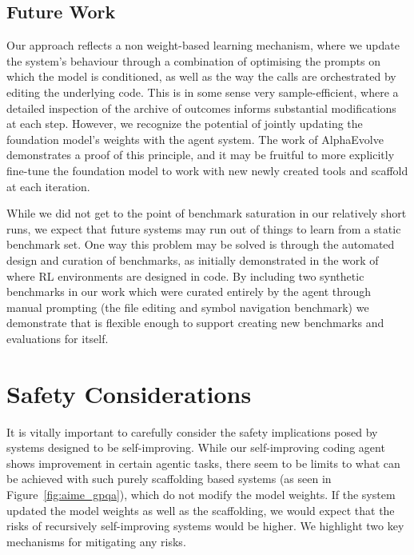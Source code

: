 \subsection{Future Work}
\label{sec:future}

Our approach reflects a non weight-based learning mechanism, where we update the
system's behaviour through a combination of optimising the prompts on which the
model is conditioned, as well as the way the  calls are orchestrated by
editing the underlying code. This is in some sense very sample-efficient, where
a detailed inspection of the archive of outcomes informs substantial
modifications at each step. However, we recognize the potential of jointly
updating the foundation model's weights with the agent system. The work of
AlphaEvolve \citep{novikovAlphaEvolveCodingAgent2025} demonstrates a proof of
this principle, and it may be fruitful to more explicitly fine-tune the foundation
model to work with new newly created tools and scaffold at each iteration.

While we did not get to the point of benchmark saturation in our relatively
short runs, we expect that future systems may run out of things to learn from a
static benchmark set. One way this problem may be solved is through the
automated design and curation of benchmarks, as initially demonstrated in the
work of \cite{faldorOMNIEPICOpenendednessModels2024} where RL environments are
designed in code. By including two synthetic benchmarks in our work which were
curated entirely by the agent through manual prompting (the file editing and
symbol navigation benchmark) we demonstrate that  is flexible enough
to support creating new benchmarks and evaluations for itself.

\section{Safety Considerations}%
\label{subsec:safety}

It is vitally important to carefully consider the safety implications posed by systems designed to be self-improving.
While our self-improving coding agent shows improvement in certain agentic tasks, there seem to be limits to what
can be achieved with such purely scaffolding based systems (as seen in Figure~\ref{fig:aime_gpqa}), which do not modify the model weights.
If the system updated the model weights as well as the scaffolding, we would expect that the risks of recursively self-improving systems would be higher. We highlight two key mechanisms for mitigating any risks.

